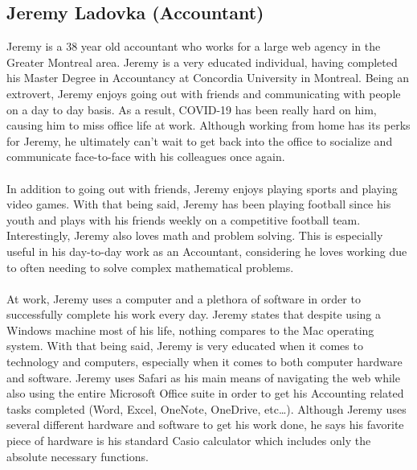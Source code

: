 \documentclass[11pt,onside]{report}
\begin{document}
\subsection{Jeremy Ladovka (Accountant)}
\begin{description}
Jeremy is a 38 year old accountant who works for a large web agency in the Greater Montreal area. Jeremy is a very educated individual, having completed his Master Degree in Accountancy at Concordia University in Montreal. Being an extrovert, Jeremy enjoys going out with friends and communicating with people on a day to day basis. As a result, COVID-19 has been really hard on him, causing him to miss office life at work. Although working from home has its perks for Jeremy, he ultimately can’t wait to get back into the office to socialize and communicate face-to-face with his colleagues once again. \\ \\

In addition to going out with friends, Jeremy enjoys playing sports and playing video games. With that being said, Jeremy has been playing football since his youth and plays with his friends weekly on a competitive football team. Interestingly, Jeremy also loves math and problem solving. This is especially useful in his day-to-day work as an Accountant, considering he loves working due to often needing to solve complex mathematical problems. \\ \\

At work, Jeremy uses a computer and a plethora of software in order to successfully complete his work every day. Jeremy states that despite using a Windows machine most of his life, nothing compares to the Mac operating system. With that being said, Jeremy is very educated when it comes to technology and computers, especially when it comes to both computer hardware and software. Jeremy uses Safari as his main means of navigating the web while also using the entire Microsoft Office suite in order to get his Accounting related tasks completed (Word, Excel, OneNote, OneDrive, etc…). Although Jeremy uses several different hardware and software to get his work done, he says his favorite piece of hardware is his standard Casio calculator which includes only the absolute necessary functions.
\end{description}
\end{document}
